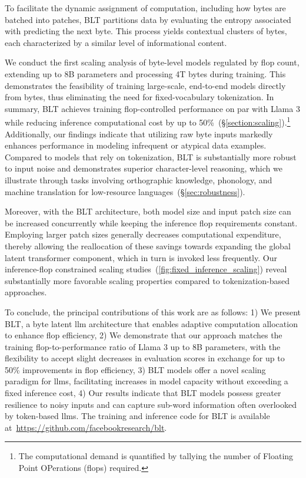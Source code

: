 To facilitate the dynamic assignment of computation, including how bytes are batched into patches, {\textsc BLT} partitions data by evaluating the entropy associated with predicting the next byte. This process yields contextual clusters of bytes, each characterized by a similar level of informational content.

We conduct the first scaling analysis of byte-level models regulated by flop count, extending up to 8B parameters and processing 4T bytes during training. This demonstrates the feasibility of training large-scale, end-to-end models directly from bytes, thus eliminating the need for fixed-vocabulary tokenization. In summary, {\textsc BLT} achieves training flop-controlled performance on par with Llama 3 while reducing inference computational cost by up to 50\%~(\S\ref{section:scaling}).\footnote{The computational demand is quantified by tallying the number of Floating Point OPerations (flops) required.} Additionally, our findings indicate that utilizing raw byte inputs markedly enhances performance in modeling infrequent or atypical data examples. Compared to models that rely on tokenization, {\textsc BLT} is substantially more robust to input noise and demonstrates superior character-level reasoning, which we illustrate through tasks involving orthographic knowledge, phonology, and machine translation for low-resource languages~(\S\ref{sec:robustness}).

Moreover, with the {\textsc BLT} architecture, both model size and input patch size can be increased concurrently while keeping the inference flop requirements constant. Employing larger patch sizes generally decreases computational expenditure, thereby allowing the reallocation of these savings towards expanding the global latent transformer component, which in turn is invoked less frequently. Our inference-flop constrained scaling studies~(\autoref{fig:fixed_inference_scaling}) reveal substantially more favorable scaling properties compared to tokenization-based approaches.

To conclude, the principal contributions of this work are as follows: 1) We present {\textsc BLT}, a byte latent llm architecture that enables adaptive computation allocation to enhance flop efficiency, 2) We demonstrate that our approach matches the training flop-to-performance ratio of Llama 3 up to 8B parameters, with the flexibility to accept slight decreases in evaluation scores in exchange for up to 50\% improvements in flop efficiency, 3) {\textsc BLT} models offer a novel scaling paradigm for llms, facilitating increases in model capacity without exceeding a fixed inference cost, 4) Our results indicate that {\textsc BLT} models possess greater resilience to noisy inputs and can capture sub-word information often overlooked by token-based llms. The training and inference code for {\textsc BLT} is available at~\url{https://github.com/facebookresearch/blt}.

